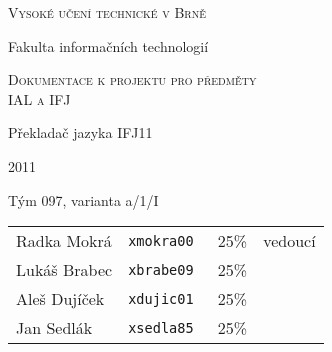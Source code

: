 \thispagestyle{empty}

\begin{center}
\Large{\scshape Vysoké učení technické v Brně}

\vspace{0.5cm}

\large{Fakulta informačních technologií}

\vfill

\Large{\scshape Dokumentace k projektu pro předměty\\IAL a IFJ}

%

\vfill

\LARGE{Překladač jazyka IFJ11}

2011

\vfill

\large{Tým 097, varianta a/1/I}
\end{center}

\vspace{0.5cm}

\begin{tabular}{l l r l}
Radka Mokrá  & \tt{xmokra00} & 25\% & vedoucí \\ 
Lukáš Brabec & \tt{xbrabe09} & 25\% & \\
Aleš Dujíček & \tt{xdujic01} & 25\% & \\
Jan Sedlák   & \tt{xsedla85} & 25\% & \\
\end{tabular}


\newpage{}

